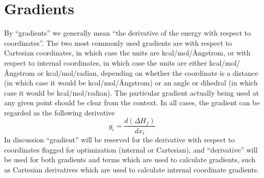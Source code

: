 \section{Gradients}\label{derivs}
By ``gradients'' we generally mean ``the derivative of the energy with respect
to coordinates''.  The two most commonly used gradients are with respect to
Cartesian coordinates, in which case the units are kcal/mol/\AA ngstrom, or
with respect to internal coordinates, in which case the units are either 
kcal/mol/\AA ngstrom or kcal/mol/radian, depending on whether the coordinate is
a distance (in which case it would be kcal/mol/\AA ngstrom) or an angle or
dihedral (in which case it would be kcal/mol/radian). The particular gradient
actually being used at any given point should be clear from the context. In all
cases, the gradient can be regarded as the following derivative
$$
g_i = \frac{d(\Delta H_f)}{dx_i}
$$
In discussion ``gradient'' will be reserved for the derivative with respect to
coordinates flagged for optimization (internal or Cartesian), and
``derivative'' will be used for both gradients and terms which are used to
calculate gradients, such as Cartesian derivatives which are used to calculate
internal coordinate gradients.

